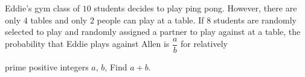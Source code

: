 Eddie's gym class of $10$ students decides to play ping pong. However, there are only $4$ tables and only $2$ people can play at a table. If $8$ students are randomly selected to play and randomly assigned a partner to play against at a table, the probability that Eddie plays against Allen is  $\dfrac{a}{b}$ for relatively

prime positive integers $a$, $b$, Find $a + b$.
